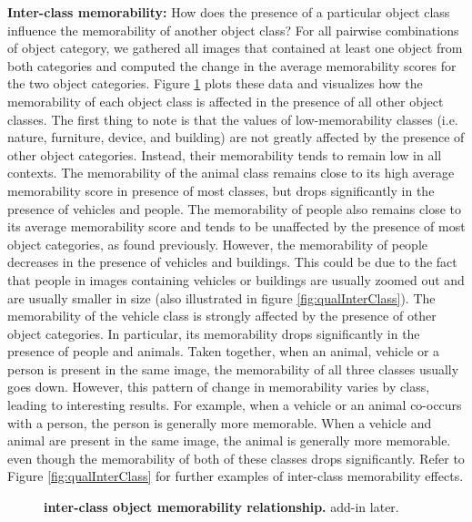 \textbf{Inter-class memorability:} How does the presence of a particular object class influence the memorability of another object class? For all pairwise combinations of object category, we gathered all images that contained at least one object from both categories and computed the change in the average memorability scores for the two object categories. Figure \ref{fig:obLabelPair} plots these data and  visualizes how the memorability of each object class is affected in the presence of all other object classes. The first thing to note is that the values of low-memorability classes (i.e. nature, furniture, device, and building) are not greatly affected by the presence of other object categories. Instead, their memorability tends to remain low in all contexts. The memorability of the animal class remains close to its high average memorability score in presence of most classes, but drops significantly in the presence of vehicles and people. The memorability of people also remains close to its average memorability score and tends to be unaffected by the presence of most object categories, as found previously. However, the memorability of people  decreases  in the presence of vehicles and buildings. This could be due to the fact that people in images containing vehicles or buildings are usually zoomed out and are usually smaller in size (also illustrated in figure \ref{fig:qualInterClass}). The memorability of the vehicle class is strongly affected by the presence of other object categories. In particular, its memorability drops significantly in the presence of people and animals. Taken together, when an animal, vehicle or a person is present in the same image, the memorability of all three classes usually goes down. However, this pattern of change in memorability varies by class, leading to interesting results. For example, when a vehicle or an animal co-occurs with a person, the person is generally more memorable. When a vehicle and animal are present in the same image, the animal is generally more memorable. even though the memorability of both of these classes drops significantly. Refer to Figure \ref{fig:qualInterClass} for further examples of  inter-class memorability effects.

\begin{figure}[b]
\centering
{}
\vspace{-5mm}\caption{\footnotesize\textbf{inter-class object memorability relationship.} add-in later. }\label{fig:obLabelPair}
\end{figure}

